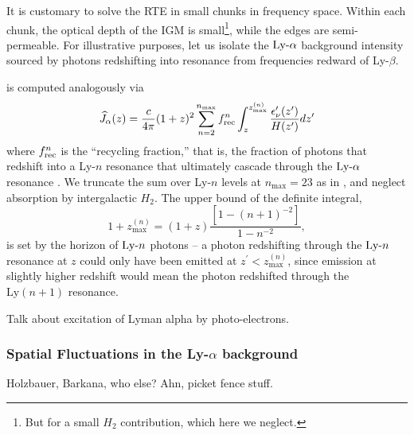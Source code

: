 It is customary to solve the RTE in small chunks in frequency space. Within each chunk, the optical depth of the IGM is small\footnote{But for a small $H_2$ contribution, which here we neglect.}, while the edges are semi-permeable. For illustrative purposes, let us isolate the $\text{Ly-}\alpha$ background intensity sourced by photons redshifting into resonance from frequencies redward of Ly-$\beta$.


is computed analogously via
\begin{equation}
    \widehat{J}_{\alpha}(z) = \frac{c}{4\pi} (1 + z)^2 \sum_{n = 2}^{n_{\text{max}}} f_{\text{rec}}^{n} \int_z^{z_{\max}^{(n)}} \frac{\epsilon_{\nu}^{\prime}(z^{\prime})}{H(z^{\prime})} dz^{\prime} \label{eq:LymanAlphaFlux}
\end{equation}
where $f_{\text{rec}}^{n}$ is the ``recycling fraction,'' that is, the fraction of photons that redshift into a Ly-$n$ resonance that ultimately cascade through the $\text{Ly-}\alpha$ resonance \cite{Pritchard2006}. We truncate the sum over Ly-$n$ levels at $n_{\max}=23$ as in \cite{Barkana2005}, and neglect absorption by intergalactic $H_2$. The upper bound of the definite integral,
\begin{equation}
    1 + z_{\max}^{(n)} = (1 + z) \frac{\left[1 - (n + 1)^{-2}\right]}{1 - n^{-2}} ,
\end{equation}
is set by the horizon of $\text{Ly-}n$ photons -- a photon redshifting through the  $\text{Ly-}n$ resonance at $z$ could only have been emitted at $z^{\prime} < z_{\max}^{(n)}$, since emission at slightly higher redshift would mean the photon redshifted through the $\text{Ly}(n+1)$ resonance.


Talk about excitation of Lyman alpha by photo-electrons.

\subsubsection{Spatial Fluctuations in the Ly-$\alpha$ background} 
Holzbauer, Barkana, who else? Ahn, picket fence stuff.





